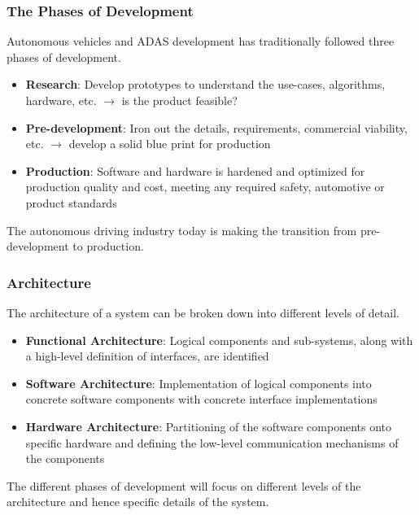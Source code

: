 \documentclass[aspectratio=169]{beamer}
\begin{document}
\begin{frame}
\frametitle{The Phases of Development}
Autonomous vehicles and ADAS development has traditionally followed three phases
of development.

\begin{itemize}
    \item \textbf{Research}: Develop prototypes to understand the use-cases, algorithms,
        hardware, etc. $\rightarrow$ is the product feasible?
    \item \textbf{Pre-development}: Iron out the details, requirements, commercial
        viability, etc. $\rightarrow$ develop a solid blue print for production
    \item \textbf{Production}: Software and hardware is hardened and optimized for
        production quality and cost, meeting any required safety, automotive or
        product standards
\end{itemize}
\pause
\begin{block}{}
The autonomous driving industry today is making the transition from
pre-development to production.
\end{block}
\end{frame}

\begin{frame}
\frametitle{Architecture}
The architecture of a system can be broken down into different levels
of detail.
\begin{itemize}
    \item \textbf{Functional Architecture}: Logical components and sub-systems,
        along with a high-level definition of interfaces, are identified
    \item \textbf{Software Architecture}: Implementation of logical components
        into concrete software components with concrete interface
        implementations
    \item \textbf{Hardware Architecture}: Partitioning of the software
        components onto specific hardware and defining the low-level
        communication mechanisms of the components
\end{itemize}
The different phases of development will focus on different levels of
the architecture and hence specific details of the system.
\end{frame}





\end{document}
